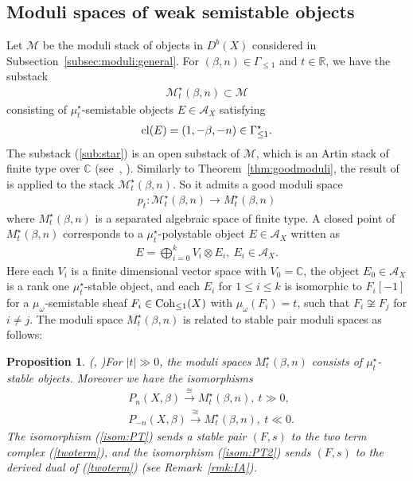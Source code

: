 \documentclass[11pt]{amsart}
\theoremstyle{plain}
\newtheorem{prop}[thm]{Proposition}
\theoremstyle{definition}
\theoremstyle{remark}
\newcommand{\aA}{\mathcal{A}}
\newcommand{\mM}{\mathcal{M}}
\newcommand{\Coh}{\mathop{\rm Coh}\nolimits}
\newcommand{\cl}{\mathop{\rm cl}\nolimits}
\begin{document}
\subsection{Moduli spaces of weak semistable objects}\label{subsec:weak}
Let $\mM$ be the 
moduli stack of objects
in $D^b(X)$
considered in Subsection~\ref{subsec:moduli:general}. 
For $(\beta, n) \in \Gamma_{\le 1}$ and $t \in \mathbb{R}$, we have 
the substack
\begin{align}\label{sub:star}
\mM_t^{\star}(\beta, n) \subset \mM
\end{align}
consisting of $\mu_t^{\star}$-semistable 
objects $E \in \aA_X$ satisfying 
\begin{align*}
\cl(E)=(1, -\beta, -n) 
\in \Gamma_{\le 1}^{\star}. 
\end{align*}
The substack (\ref{sub:star}) is 
an open substack of $\mM$, which is an Artin stack 
of finite type over $\mathbb{C}$
(see~\cite[Proposition~3.17]{Tolim2}, \cite[Proposition~5.4]{Tsurvey}). 
Similarly to Theorem~\ref{thm:goodmoduli}, 
the result of~\cite{AHLH} is applied 
to the stack $\mM_t^{\star}(\beta, n)$.
So it admits a good moduli space
\begin{align}\label{good:star}
p_t \colon
\mM_t^{\star}(\beta, n) \to M_t^{\star}(\beta, n)
\end{align} 
where $M_t^{\star}(\beta, n)$
is a separated algebraic space of finite type. 
A closed point of $M_t^{\star}(\beta, n)$ corresponds to 
a $\mu_t^{\star}$-polystable object
$E \in \aA_X$ written as 
\begin{align}\label{mu:pstable}
E=\bigoplus_{i=0}^k V_i \otimes E_i, \ E_i \in \aA_X.
\end{align}
Here 
each $V_i$ is a finite dimensional vector space with 
$V_0=\mathbb{C}$, the object
$E_0 \in \aA_X$ is a rank one 
$\mu_t^{\star}$-stable object, 
and each $E_i$ for $1\le i\le k$ is 
isomorphic to $F_i[-1]$ for a $\mu_{\omega}$-semistable
sheaf $F_i \in \Coh_{\le 1}(X)$ with $\mu_{\omega}(F_i)=t$,
such that $F_i \not\cong F_j$ for $i\neq j$.
The moduli space $M_t^{\star}(\beta, n)$ is related to stable pair 
moduli spaces as follows: 
\begin{prop}\emph{(\cite[Theorem~3.21]{Tolim2}, \cite[Proposition~5.4]{Tsurvey})}\label{prop:isom}
For $\lvert t \rvert \gg 0$, 
the moduli spaces $M_t^{\star}(\beta, n)$
consists of $\mu_t^{\star}$-stable objects. 
Moreover we have the isomorphisms 
\begin{align}\label{isom:PT}
&P_n(X, \beta) \stackrel{\cong}{\to}
M_{t}^{\star}(\beta, n), \ t \gg 0, \\
\label{isom:PT2}
&P_{-n}(X, \beta) \stackrel{\cong}{\to}
M_{t}^{\star}(\beta, n), \ t \ll 0.
\end{align}
The isomorphism (\ref{isom:PT}) sends a stable pair $(F, s)$
to the two term complex (\ref{twoterm}), and the isomorphism (\ref{isom:PT2})
sends $(F, s)$ to the derived dual of (\ref{twoterm})
(see Remark~\ref{rmk:IA}). 
\end{prop}
\end{document}
